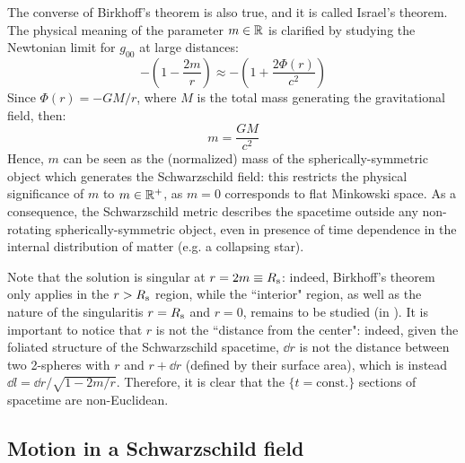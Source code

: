 The converse of Birkhoff's theorem is also true, and it is called Israel's theorem. The physical meaning of the parameter $ m \in \mathbb{R} $ is clarified by studying the Newtonian limit for $ g_{00} $ at large distances:
\begin{equation*}
  - \left( 1 - \frac{2m}{r} \right) \approx - \left( 1 + \frac{2 \Phi(r)}{c^2} \right)
\end{equation*}
Since $ \Phi(r) = - GM / r $, where $ M $ is the total mass generating the gravitational field, then:
\begin{equation}
  m = \frac{GM}{c^2}
\end{equation}
Hence, $ m $ can be seen as the (normalized) mass of the spherically-symmetric object which generates the Schwarzschild field: this restricts the physical significance of $ m $ to $ m \in \mathbb{R}^+ $, as $ m = 0 $ corresponds to flat Minkowski space. As a consequence, the Schwarzschild metric describes the spacetime outside any non-rotating spherically-symmetric object, even in presence of time dependence in the internal distribution of matter (e.g. a collapsing star).

Note that the solution is singular at $ r = 2m \equiv R_\text{s} $: indeed, Birkhoff's theorem only applies in the $ r > R_\text{s} $ region, while the ``interior" region, as well as the nature of the singularitis $ r = R_\text{s} $ and $ r = 0 $, remains to be studied (in ). It is important to notice that $ r $ is not the ``distance from the center": indeed, given the foliated structure of the Schwarzschild spacetime, $ \dd r $ is not the distance between two 2-spheres with $ r $ and $ r + \dd r $ (defined by their surface area), which is instead $ \dd l = \dd r / \sqrt{1 - 2m / r} $. Therefore, it is clear that the $ \{t = \text{const.}\} $ sections of spacetime are non-Euclidean.

\subsection{Motion in a Schwarzschild field}

